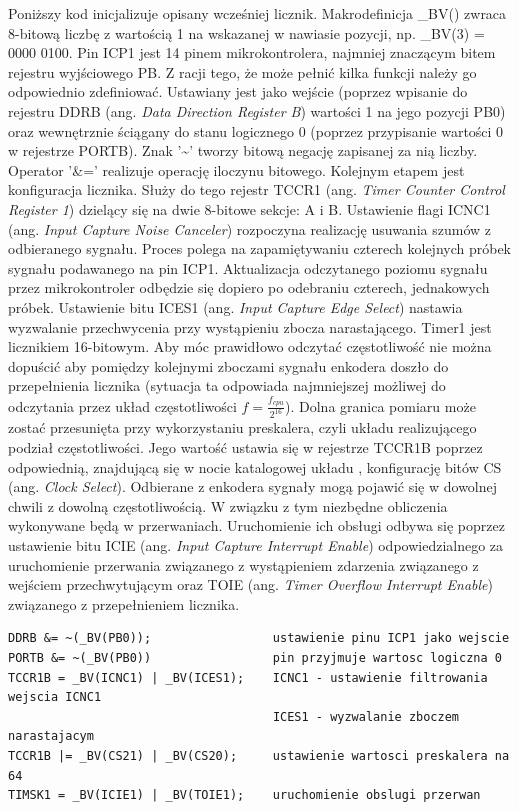   Poniższy kod inicjalizuje opisany wcześniej licznik. Makrodefinicja \_BV() zwraca 8-bitową liczbę z wartością 1 na wskazanej w nawiasie pozycji, np. \_BV(3) = 0000 0100. Pin ICP1 jest 14 pinem mikrokontrolera, najmniej znaczącym bitem rejestru wyjściowego PB. Z racji tego, że może pełnić kilka funkcji należy go odpowiednio zdefiniować. Ustawiany jest jako wejście (poprzez wpisanie do rejestru DDRB (ang. \textit{Data Direction Register B}) wartości 1 na jego pozycji PB0) oraz wewnętrznie ściągany do stanu logicznego 0 (poprzez przypisanie wartości 0 w rejestrze PORTB). Znak '\textasciitilde' tworzy bitową negację zapisanej za nią liczby. Operator '\&=' realizuje operację iloczynu bitowego. Kolejnym etapem jest konfiguracja licznika. Służy do tego rejestr TCCR1 (ang. \textit{Timer Counter Control Register 1}) dzielący się na dwie 8-bitowe sekcje: A i B. Ustawienie flagi ICNC1 (ang. \textit{Input Capture Noise Canceler}) rozpoczyna realizację usuwania szumów z odbieranego sygnału. Proces polega na zapamiętywaniu czterech kolejnych próbek sygnału podawanego na pin ICP1. Aktualizacja odczytanego poziomu sygnału przez mikrokontroler odbędzie się dopiero po odebraniu czterech, jednakowych próbek. Ustawienie bitu ICES1 (ang. \textit{Input Capture Edge Select}) nastawia wyzwalanie przechwycenia przy wystąpieniu zbocza narastającego. Timer1 jest licznikiem 16-bitowym. Aby móc prawidłowo odczytać częstotliwość nie można dopuścić aby pomiędzy kolejnymi zboczami sygnału enkodera doszło do przepełnienia licznika (sytuacja ta odpowiada najmniejszej możliwej do odczytania przez układ częstotliwości $f=\frac{f_{cpu}}{2^{16}}$).
Dolna granica pomiaru może zostać przesunięta przy wykorzystaniu preskalera, czyli układu realizującego podział częstotliwości. Jego wartość ustawia się w rejestrze TCCR1B poprzez odpowiednią, znajdującą się w nocie katalogowej układu \cite{nota}, konfigurację bitów CS (ang. \textit{Clock Select}). Odbierane z enkodera sygnały mogą pojawić się w dowolnej chwili z dowolną częstotliwością. W związku z tym niezbędne obliczenia wykonywane będą w przerwaniach. Uruchomienie ich obsługi odbywa się poprzez ustawienie bitu ICIE (ang. \textit{Input Capture Interrupt Enable}) odpowiedzialnego za uruchomienie przerwania związanego z wystąpieniem zdarzenia związanego z wejściem przechwytującym oraz TOIE (ang. \textit{Timer Overflow Interrupt Enable}) związanego z przepełnieniem licznika.
\begin{lstlisting}[caption=Python example \small{small text}]
DDRB &= ~(_BV(PB0));                 ustawienie pinu ICP1 jako wejscie 
PORTB &= ~(_BV(PB0))                 pin przyjmuje wartosc logiczna 0
TCCR1B = _BV(ICNC1) | _BV(ICES1);    ICNC1 - ustawienie filtrowania wejscia ICNC1
                                     ICES1 - wyzwalanie zboczem narastajacym 
TCCR1B |= _BV(CS21) | _BV(CS20);     ustawienie wartosci preskalera na 64
TIMSK1 = _BV(ICIE1) | _BV(TOIE1);    uruchomienie obslugi przerwan
\end{lstlisting}

